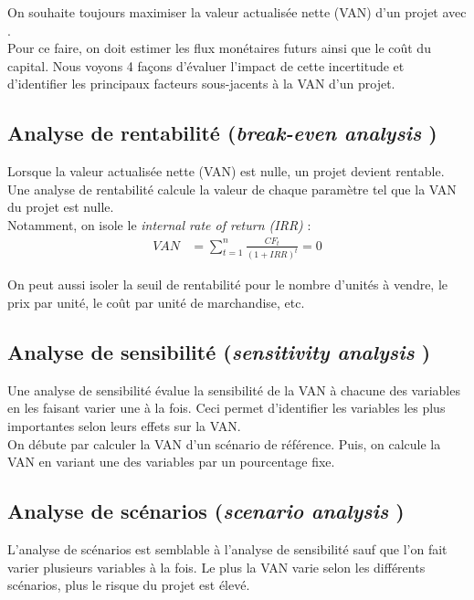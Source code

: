 \documentclass[10pt, french]{article}
\begin{document}
\begin{multicols*}{2}
On souhaite toujours maximiser la valeur actualisée nette (VAN) d'un projet avec .\\
Pour ce faire, on doit estimer les flux monétaires futurs ainsi que le coût du capital. Nous voyons 4 façons d'évaluer l'impact de cette incertitude et d'identifier les principaux facteurs sous-jacents à la VAN d'un projet.

\subsection*{Analyse de rentabilité (\og \textit{break-even analysis} \fg{})}
Lorsque la valeur actualisée nette (VAN) est nulle, un projet devient rentable.\\
Une analyse de rentabilité calcule la valeur de chaque paramètre tel que la VAN du projet est nulle. \\
Notamment, on isole le \og \textit{internal rate of return (IRR)} \fg{}:
\begin{align*}
	VAN
	&=	\sum_{t	=	1}^{n}\frac{CF_{t}}{(1	+	IRR)^{t}}
	=	0
\end{align*}

On peut aussi isoler la seuil de rentabilité pour le nombre d'unités à vendre, le prix par unité, le coût par unité de marchandise, etc.

\subsection*{Analyse de sensibilité (\og \textit{sensitivity analysis} \fg{})}
Une analyse de sensibilité évalue la sensibilité de la VAN à chacune des variables en les faisant varier une à la fois. Ceci permet d'identifier les variables les plus importantes selon leurs effets sur la VAN.\\

On débute par calculer la VAN d'un scénario de référence. Puis, on calcule la VAN en variant une des variables par un pourcentage fixe. 

\subsection*{Analyse de scénarios (\og \textit{scenario analysis} \fg{})}
L'analyse de scénarios est semblable à l'analyse de sensibilité sauf que l'on fait varier plusieurs variables à la fois. Le plus la VAN varie selon les différents scénarios, plus le risque du projet est élevé.


\end{multicols*}
\end{document}
